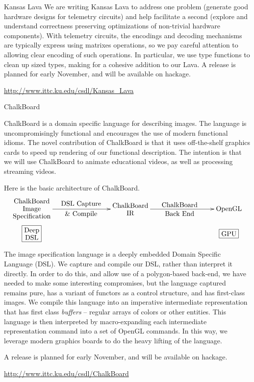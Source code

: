 \documentclass{scrreprt}
\begin{document}
\begin{hcarentry}{Kansas Lava}
We are writing Kansas Lava to address one problem (generate good hardware designs for telemetry circuits)
and help facilitate a second (explore and understand correctness preserving optimizations of non-trivial
hardware components).
With telemetry circuits, the encodings and decoding mechanisms
are typically express using matrixes operations, so we pay careful
attention to allowing clear encoding of such operations.
In particular, we use type functions to clean up sized types, 
making for a cohesive addition to our Lava.
A release is planned for early November, and will be available on hackage.

\FurtherReading
  \url{http://www.ittc.ku.edu/csdl/Kansas_Lava}
\end{hcarentry}

\begin{hcarentry}{ChalkBoard}
\makeheader

ChalkBoard is a domain specific language for describing images. 
The language is uncompromisingly functional
and encourages the use of modern functional idioms.
The novel contribution of ChalkBoard is that it uses off-the-shelf
graphics cards to speed up rendering of our functional description.
The intention is that we will use ChalkBoard to animate educational
videos, as well as processing streaming videos.

Here is the basic architecture of ChalkBoard. 
\small
\[
\xygraph{
!{(-4,0)}{\txt{ChalkBoard\\Image\\Specification}}="CIS",
!{(-4,-1)}*+[F]{\txt{Deep\\DSL}},
!{(0,0)}*+{\txt{ChalkBoard\\IR}}="CBIR",
!{(4,0)}{\txt{OpenGL}}="OpenGL",
!{(4,-1)}*+[F]{\txt{GPU}},
"CIS" :@{->}^{\txt{DSL Capture}}_{\txt{\& Compile}} "CBIR",
"CBIR" :@{->}^{\txt{ChalkBoard}}_{\txt{Back End}} "OpenGL",
!{}
}
\]

The image specification language is a deeply embedded Domain Specific Language (DSL).
We capture and compile our DSL, rather than interpret it directly. 
In order to do this, and allow use of a polygon-based back-end,
we have needed to make some interesting compromises,
but the language captured remains pure, has a variant
of functors as a control structure,
and has first-class images.
We compile this language into an imperative intermediate representation
that has first class {\em buffers} -- regular arrays of colors or other entities.
This language is then interpreted by macro-expanding each intermediate representation
command into a set of OpenGL commands.  In this
way, we leverage modern  graphics boards to
do the heavy lifting of the language. 

A release is planned for early November, and will be available on hackage.

\FurtherReading
  \url{http://www.ittc.ku.edu/csdl/ChalkBoard}
\end{hcarentry}
\end{document}
